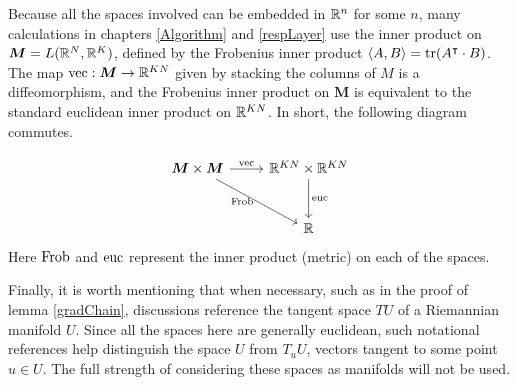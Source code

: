 Because all the spaces involved can be embedded in \( \mathbb R^n \) for some \( n \), many calculations in chapters \ref{Algorithm} and \ref{respLayer} use the inner product on $\bm M=L(\mathbb R^N,\mathbb R^K)$, defined by the Frobenius inner product $\langle A,B\rangle=\operatorname{tr}(A^{\intercal}\cdot B)$. The map $\operatorname{vec}:\bm M\rightarrow \mathbb R^{KN}$ given by stacking the columns of $M$ is a diffeomorphism, and the Frobenius inner product on $\bm M$ is equivalent to the standard euclidean inner product on $\mathbb R^{KN}$.  In short, the following diagram commutes.

\begin{equation}\label{eqn:vecfrobcommute}
\begin{tikzcd}
\bm M\times \bm M \arrow[dr, "\op{Frob}" left] \arrow[r, "\op{vec}" above] & \R^{KN}\times \R^{KN} \arrow[d, "\op{euc}" right]\\
[1em] & \R
\end{tikzcd}
\end{equation}
Here $\operatorname{Frob}$ and $\operatorname{euc}$ represent the inner product (metric) on each of the spaces.  

Finally, it is worth mentioning that when necessary, such as in the proof of lemma \ref{gradChain}, discussions reference the tangent space \( TU \) of a Riemannian manifold \( U \).  Since all the spaces here are generally euclidean, such notational references help distinguish the space \( U \) from \( T_uU \), vectors tangent to some point \( u\in U \). The full strength of considering these spaces as manifolds will not be used.
